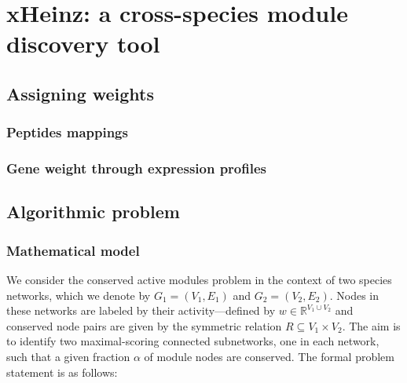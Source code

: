\chapter{xHeinz: a cross-species module discovery tool}
\label{chap:xheinz}

\section{Assigning weights}
\label{sec:weights}

	\subsection{Peptides mappings}

	\subsection{Gene weight through expression profiles}

\section{Algorithmic problem}
\label{sec:mip}

	\subsection{Mathematical model}

		We consider the conserved active modules problem in the context of two species networks, which we denote by $G_1 = (V_1, E_1)$ and $G_2 = (V_2, E_2)$.
		Nodes in these networks are labeled by their activity---defined by $w \in \mathbb{R}^{V_1 \cup V_2}$ and conserved node pairs are given by the symmetric relation $R \subseteq V_1 \times V_2$. The aim is to identify two maximal-scoring connected subnetworks, one in each network, such that a given fraction $\alpha$ of module nodes are conserved.
		The formal problem statement is as follows:

